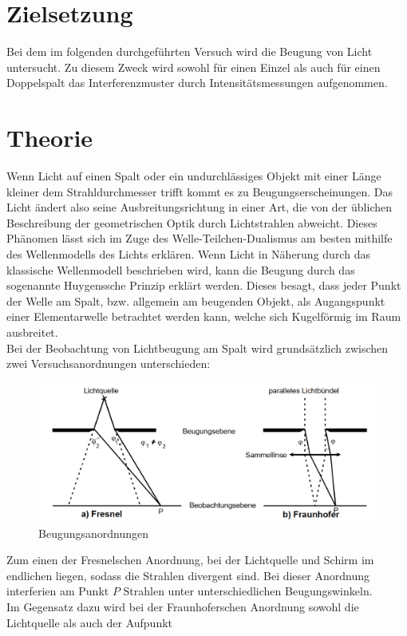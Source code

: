 \section{Zielsetzung}
Bei dem im folgenden durchgeführten Versuch wird die Beugung von Licht untersucht. Zu diesem Zweck wird sowohl für einen Einzel als 
auch für einen Doppelspalt das Interferenzmuster durch Intensitätsmessungen aufgenommen.
\section{Theorie}
Wenn Licht auf einen Spalt oder ein undurchlässiges Objekt mit einer Länge kleiner dem Strahldurchmesser trifft kommt es zu Beugungserscheinungen.
Das Licht ändert also seine Ausbreitungsrichtung in einer Art, die von der üblichen Beschreibung der geometrischen Optik durch Lichtstrahlen
abweicht. Dieses Phänomen lässt sich im Zuge des Welle-Teilchen-Dualismus am besten mithilfe des Wellenmodells des Lichts erklären.
Wenn Licht in Näherung durch das klassische Wellenmodell beschrieben wird, kann die Beugung durch das sogenannte Huygenssche Prinzip erklärt werden.
Dieses besagt, dass jeder Punkt der Welle am Spalt, bzw. allgemein am beugenden Objekt, als Augangspunkt einer Elementarwelle betrachtet werden kann, welche 
sich Kugelförmig im Raum ausbreitet. \\
Bei der Beobachtung von Lichtbeugung am Spalt wird grundsätzlich zwischen zwei Versuchsanordnungen unterschieden: 
\begin{figure} [h]
    \centering
    \includegraphics[width=14cm, keepaspectratio]{Beugungsanordnungen}
    \caption{Beugungsanordnungen}
 \end{figure}
Zum einen der Fresnelschen Anordnung, bei der
Lichtquelle und Schirm im endlichen liegen, sodass die Strahlen divergent sind. Bei dieser Anordnung interferien am Punkt $P$ Strahlen unter
unterschiedlichen Beugungswinkeln. \\ Im Gegensatz dazu wird bei der Fraunhoferschen Anordnung sowohl die Lichtquelle als auch der Aufpunkt
